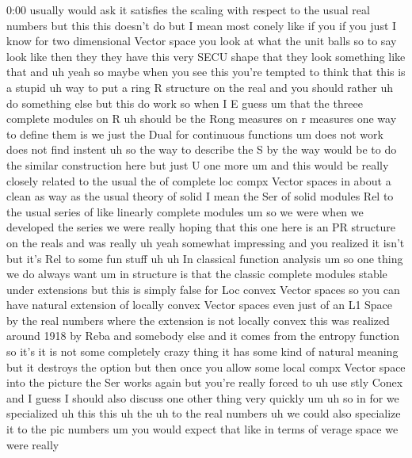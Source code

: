 \begin{unfinished}{0:00}
usually  would  ask  it  satisfies  the
scaling  with  respect  to  the  usual  real
numbers  but  this  this  doesn't
do  but  I  mean  most  conely  like  if  you  if
you  just  I  know  for  two  dimensional
Vector  space  you  look  at  what  the  unit
balls  so  to  say  look  like  then  they  they
have  this  very  SECU  shape  that  they  look
something  like
that  and  uh
yeah  so  maybe  when  you  see  this  you're
tempted  to  think  that  this  is  a  stupid
uh  way  to  put  a  ring  R  structure  on  the
real  and  you  should  rather  uh  do
something
else  but  this  do  work  so  when  I  E
guess
um  that  the  threee  complete  modules  on  R
uh  should  be  the  Rong  measures  on  r
measures  one  way  to  define  them  is  we
just  the  Dual  for  continuous
functions  um  does  not
work  does  not  find
instent
uh  so  the  way  to  describe  the  S  by  the
way  would  be  to  do  the  similar
construction  here  but  just  U  one
more  um  and  this  would  be  really  closely
related  to  the  usual  the  of  complete  loc
compx  Vector  spaces  in  about  a  clean  as
way  as  the  usual  theory  of  solid  I  mean
the  Ser  of  solid  modules  Rel  to  the
usual  series  of  like  linearly  complete
modules  um
so  we  were  when  we  developed  the  series
we  were  really  hoping  that  this  one  here
is  an  PR  structure  on  the  reals  and  was
really
uh  yeah  somewhat  impressing  and  you
realized  it
isn't  but  it's  Rel  to  some  fun  stuff  uh
uh  In  classical  function  analysis  um  so
one  thing  we  do  always  want  um  in
structure  is  that  the  classic  complete
modules  stable  under  extensions  but  this
is  simply  false  for  Loc  convex  Vector
spaces  so  you  can  have  natural  extension
of  locally  convex  Vector  spaces  even
just  of  an  L1  Space  by  the  real  numbers
where  the  extension  is  not  locally
convex  this  was  realized  around  1918  by
Reba  and  somebody
else  and  it  comes  from  the  entropy
function  so  it's  it  is  not  some
completely  crazy  thing  it  has  some  kind
of  natural  meaning  but  it  destroys  the
option  but  then  once  you  allow  some
local  compx  Vector  space  into  the
picture  the  Ser  works
again  but  you're  really  forced  to  uh  use
stly
Conex
and  I  guess  I  should  also  discuss  one
other  thing  very  quickly
um  uh  so  in  for  we  specialized  uh
this  this  uh  the
uh  to  the  real  numbers  uh  we  could  also
specialize  it  to  the  pic
numbers  um  you  would  expect  that  like  in
terms  of  verage  space  we  were  really

\end{unfinished}
